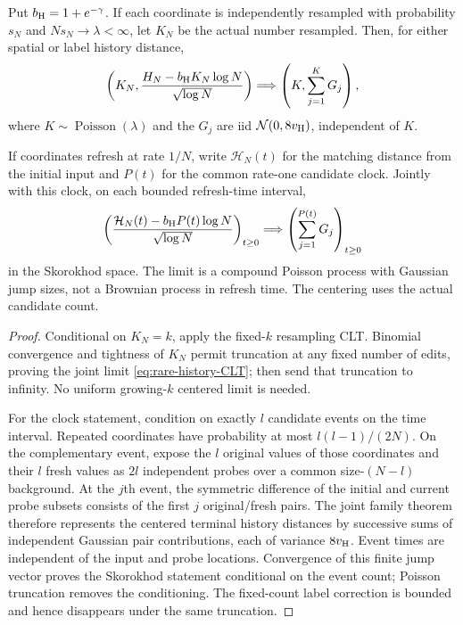 \documentclass[11pt,letterpaper]{article}
\begin{document}
\begin{corollary}
\label{cor:rare-history-CLT}
Put $b_{\rm H}=1+e^{-\gamma}$. If each coordinate is independently
resampled with probability $s_N$ and $Ns_N\to\lambda<\infty$,
let $K_N$ be the actual number resampled. Then, for either spatial
or label history distance,
\begin{equation}\label{eq:rare-history-CLT}
 \left(K_N,\frac{H_N-b_{\rm H}K_N\log N}{\sqrt{\log N}}\right)
       \Longrightarrow
       \left(K,\sum_{j=1}^K G_j\right),
\end{equation}
where $K\sim\operatorname{Poisson}(\lambda)$ and the $G_j$ are iid
$\mathcal N(0,8v_{\rm H})$, independent of $K$.

If coordinates refresh at rate $1/N$, write $\mathcal H_N(t)$ for
the matching distance from the initial input and $P(t)$ for the
common rate-one candidate clock. Jointly with this clock, on each
bounded refresh-time interval,
\begin{equation}\label{eq:history-clock-CLT}
 \left(\frac{\mathcal H_N(t)-b_{\rm H}P(t)\log N}{\sqrt{\log N}}
                                                    \right)_{t\ge0}
       \Longrightarrow\left(\sum_{j=1}^{P(t)}G_j\right)_{t\ge0}
\end{equation}
in the Skorokhod space. The limit is a compound Poisson process
with Gaussian jump sizes, not a Brownian process in refresh time.
The centering uses the actual candidate count.
\end{corollary}
\begin{proof}
Conditional on $K_N=k$, apply the fixed-$k$ resampling CLT.
Binomial convergence and tightness of $K_N$ permit truncation at
any fixed number of edits, proving the joint limit
\eqref{eq:rare-history-CLT}; then send that truncation to infinity.
No uniform growing-$k$ centered limit is needed.

For the clock statement, condition on exactly $l$ candidate events
on the time interval. Repeated coordinates have probability at
most $l(l-1)/(2N)$. On the complementary event, expose the $l$
original values of those coordinates and their $l$ fresh values
as $2l$ independent probes over a common size-$(N-l)$ background.
At the $j$th event, the symmetric difference of the initial and
current probe subsets consists of the first $j$ original/fresh
pairs. The joint family theorem therefore represents the centered
terminal history distances by successive sums of independent
Gaussian pair contributions, each of variance $8v_{\rm H}$.
Event times are independent of the input and probe locations.
Convergence of this finite jump vector proves the Skorokhod
statement conditional on the event count; Poisson truncation
removes the conditioning. The fixed-count label correction is
bounded and hence disappears under the same truncation.
\end{proof}
\end{document}
